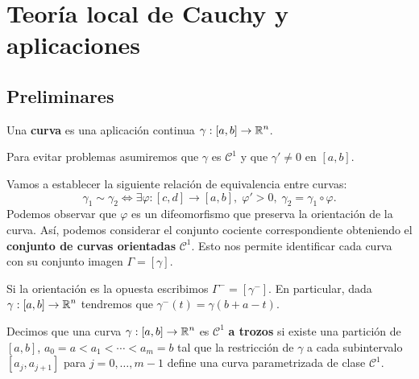\chapter{Teoría local de Cauchy y aplicaciones}
\section{Preliminares}
\begin{definition}[Curva]
	Una \textbf{curva} es una aplicación continua $\displaystyle \gamma : \left[a,b\right] \to \mathbb{R}^{n} $. 
\end{definition}
\begin{notation}
	Para evitar problemas asumiremos que $\displaystyle \gamma  $ es $\displaystyle \mathcal{C}^{1} $ y que $\displaystyle \gamma'\neq 0 $ en $\displaystyle \left[a,b\right]  $. 
\end{notation}
Vamos a establecer la siguiente relación de equivalencia entre curvas:
\[\gamma_{1} \sim \gamma_{2} \iff \exists\varphi:\left[c,d\right] \to \left[a,b\right] , \; \varphi' > 0, \; \gamma_{2}=\gamma_{1}\circ \varphi .\]
Podemos observar que $\displaystyle \varphi $ es un difeomorfismo que preserva la orientación de la curva. Así, podemos considerar el conjunto cociente correspondiente obteniendo el \textbf{conjunto de curvas orientadas} $\displaystyle \mathcal{C}^{1} $. Esto nos permite identificar cada curva con su conjunto imagen $\displaystyle \Gamma = \left[\gamma \right]  $. 
\begin{notation}
	Si la orientación es la opuesta escribimos $\displaystyle \Gamma^{-}=\left[\gamma^{-}\right]  $. En particular, dada $\displaystyle \gamma : \left[a,b\right] \to \mathbb{R}^{n} $ tendremos que $\displaystyle \gamma^{-}\left(t\right)=\gamma\left(b+a-t\right) $. 
\end{notation}
\begin{definition}
	Decimos que una curva $\displaystyle \gamma : \left[a,b\right] \to \mathbb{R}^{n} $ es $\displaystyle \mathcal{C}^{1} $ \textbf{a trozos} si existe una partición de $\displaystyle \left[a,b\right]  $, $\displaystyle a_{0}= a < a_{1} < \cdots < a_{m} = b $ tal que la restricción de $\displaystyle \gamma  $ a cada subintervalo $\displaystyle \left[a_{j}, a_{j+1}\right]  $ para $\displaystyle j = 0, \ldots, m - 1 $ define una curva parametrizada de clase $\displaystyle \mathcal{C}^{1} $.
\end{definition}

